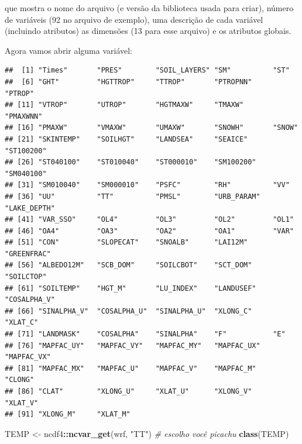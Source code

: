 \documentclass[]{book}
\newenvironment{Shaded}{\begin{snugshade}}{\end{snugshade}}
\newcommand{\KeywordTok}[1]{\textcolor[rgb]{0.13,0.29,0.53}{\textbf{#1}}}
\newcommand{\StringTok}[1]{\textcolor[rgb]{0.31,0.60,0.02}{#1}}
\newcommand{\CommentTok}[1]{\textcolor[rgb]{0.56,0.35,0.01}{\textit{#1}}}
\newcommand{\OperatorTok}[1]{\textcolor[rgb]{0.81,0.36,0.00}{\textbf{#1}}}
\newcommand{\NormalTok}[1]{#1}
\begin{document}
que mostra o nome do arquivo (e versão da biblioteca usada para criar),
número de variáveis (92 no arquivo de exemplo), uma descrição de cada
variável (incluindo atributos) as dimensões (13 para esse arquivo) e os
atributos globais.

Agora vamos abrir alguma variável:

\begin{Shaded}
\end{Shaded}

\begin{verbatim}
##  [1] "Times"       "PRES"        "SOIL_LAYERS" "SM"          "ST"         
##  [6] "GHT"         "HGTTROP"     "TTROP"       "PTROPNN"     "PTROP"      
## [11] "VTROP"       "UTROP"       "HGTMAXW"     "TMAXW"       "PMAXWNN"    
## [16] "PMAXW"       "VMAXW"       "UMAXW"       "SNOWH"       "SNOW"       
## [21] "SKINTEMP"    "SOILHGT"     "LANDSEA"     "SEAICE"      "ST100200"   
## [26] "ST040100"    "ST010040"    "ST000010"    "SM100200"    "SM040100"   
## [31] "SM010040"    "SM000010"    "PSFC"        "RH"          "VV"         
## [36] "UU"          "TT"          "PMSL"        "URB_PARAM"   "LAKE_DEPTH" 
## [41] "VAR_SSO"     "OL4"         "OL3"         "OL2"         "OL1"        
## [46] "OA4"         "OA3"         "OA2"         "OA1"         "VAR"        
## [51] "CON"         "SLOPECAT"    "SNOALB"      "LAI12M"      "GREENFRAC"  
## [56] "ALBEDO12M"   "SCB_DOM"     "SOILCBOT"    "SCT_DOM"     "SOILCTOP"   
## [61] "SOILTEMP"    "HGT_M"       "LU_INDEX"    "LANDUSEF"    "COSALPHA_V" 
## [66] "SINALPHA_V"  "COSALPHA_U"  "SINALPHA_U"  "XLONG_C"     "XLAT_C"     
## [71] "LANDMASK"    "COSALPHA"    "SINALPHA"    "F"           "E"          
## [76] "MAPFAC_UY"   "MAPFAC_VY"   "MAPFAC_MY"   "MAPFAC_UX"   "MAPFAC_VX"  
## [81] "MAPFAC_MX"   "MAPFAC_U"    "MAPFAC_V"    "MAPFAC_M"    "CLONG"      
## [86] "CLAT"        "XLONG_U"     "XLAT_U"      "XLONG_V"     "XLAT_V"     
## [91] "XLONG_M"     "XLAT_M"
\end{verbatim}

\begin{Shaded}
\begin{Highlighting}[]
\NormalTok{TEMP <-}\StringTok{ }\NormalTok{ncdf4}\OperatorTok{::}\KeywordTok{ncvar_get}\NormalTok{(wrf, }\StringTok{"TT"}\NormalTok{)  }\CommentTok{# escolho você picachu}
\KeywordTok{class}\NormalTok{(TEMP)}
\end{Highlighting}
\end{Shaded}
\end{document}
